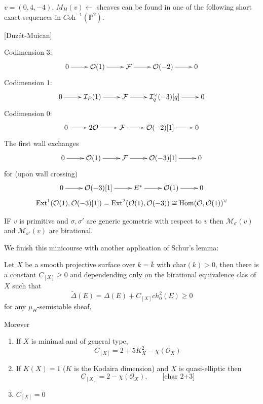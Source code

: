 \begin{example}
\label{example-duplicate-3}
$v=(0,4,-4)$, $M_H(v)\leftarrow$ sheaves can
be found in one of the following short exact
sequences in
$\textit{Coh}^{-1}(\mathbb{P}^2)$.

[Duz\'et-Muican]

\noindent
Codimension 3:
$$
\xymatrix{
0\ar[r]&\mathcal{O}(1)\ar[r]&\mathcal{F}
\ar[r]
&\mathcal{O}(-2)\ar[r]&0
}
$$
Codimension 1:
$$
\xymatrix{
0\ar[r]&\mathcal{I}_P(1)\ar[r]&\mathcal{F}
\ar[r]
&\mathcal{I}_q^\vee(-3)[q]\ar[r]&0
}
$$
Codimension 0:
$$
\xymatrix{
0\ar[r]&2\mathcal{O}\ar[r]&\mathcal{F}\ar[r]&
\mathcal{O}(-2)[1]\ar[r]&0
}
$$
The first wall exchanges
$$
\xymatrix{
0\ar[r]&\mathcal{O}(1)\ar[r]&\mathcal{F}
\ar[r]
&\mathcal{O}(-3)[1]\ar[r]&0
}
$$
for (upon wall crossing)
$$
\xymatrix{
0\ar[r]&\mathcal{O}(-3)[1]\ar[r]&E^*\ar[r]&
\mathcal{O}(1)\ar[r]&0
}
$$
$$
\begin{aligned}
\text{Ext}^1(\mathcal{O}(1),\mathcal{O}(-3)
[1]
)
=\text{Ext}^2(\mathcal{O}(1),\mathcal{O}(-3))
\cong \mathop{\mathrm{Hom}}\nolimits(\mathcal{O},\mathcal{O}(1))^\vee
\end{aligned}
$$
\end{example}

\begin{theorem}[Li-Zhao]
\label{theorem-Li-Zhao}
IF $v$ is primitive and $\sigma,\sigma'$ are
generic geometric with respect to $ v$ then
$\mathcal{M}_{\sigma}(v)$ and
$\mathcal{M}_{\sigma'}(v)$ are birational.
\end{theorem}

\medskip\noindent
We finish this minicourse with another
application of Schur's lemma:

\begin{theorem}[Koseki]
\label{theorem-Koseki}
Let $X$ be a smooth projective surface over
$k=\overline{k}$ with $\text{char}(k)>0$,
then there is a constant $C_{[X]}\geq 0$ and
dependending only on the birational
equivalence clas of $X$ such that
$$
\tilde{\Delta}(E)=\Delta(E)+C_{[X]}ch_0^2(E)
\geq
0
$$
for any $\mu_H$-semistable sheaf.
\end{theorem}

Morever
\begin{enumerate}
\item If $X$ is minimal and of general type,
$$
C_{[X]}=2+5K_X^2-\chi(\mathcal{O}_X)
$$
\item If $K(X)=1$ ($K$ is the Kodaira
dimension) and $X$ is quasi-elliptic then
$$
C_{[X]}=2-\chi(\mathcal{O}_X),\qquad
\text{[char 2+3]}
$$
\item $C_{[X]}=0$
\end{enumerate}

